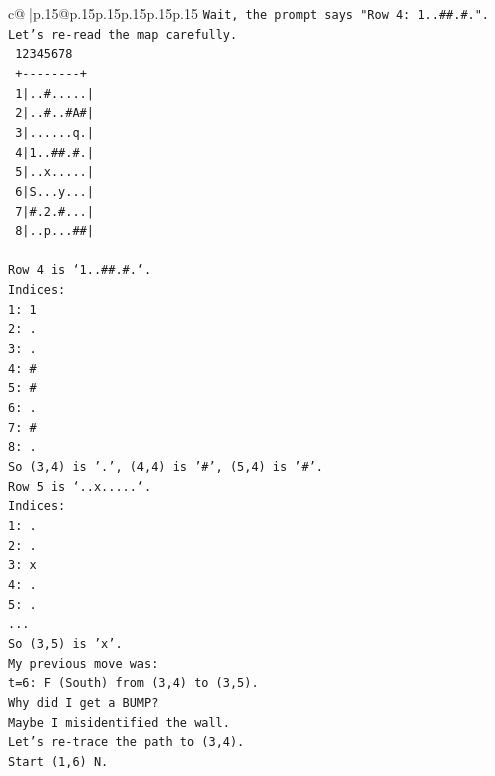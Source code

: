 \documentclass{article}
\begin{document}
{\begin{supertabular}{c@{$\;$}|p{.15\linewidth}@{}p{.15\linewidth}p{.15\linewidth}p{.15\linewidth}p{.15\linewidth}p{.15\linewidth}}
{{{\texttt{Wait, the prompt says "Row 4: 1..\#\#.\#.".} \\
\texttt{Let's re{-}read the map carefully.} \\
\texttt{   12345678} \\
\texttt{  +{-}{-}{-}{-}{-}{-}{-}{-}+} \\
\texttt{ 1|..\#.....|} \\
\texttt{ 2|..\#..\#A\#|} \\
\texttt{ 3|......q.|} \\
\texttt{ 4|1..\#\#.\#.|} \\
\texttt{ 5|..x.....|} \\
\texttt{ 6|S...y...|} \\
\texttt{ 7|\#.2.\#...|} \\
\texttt{ 8|..p...\#\#|} \\
\\ 
\texttt{Row 4 is `1..\#\#.\#.`.} \\
\texttt{Indices:} \\
\texttt{1: 1} \\
\texttt{2: .} \\
\texttt{3: .} \\
\texttt{4: \#} \\
\texttt{5: \#} \\
\texttt{6: .} \\
\texttt{7: \#} \\
\texttt{8: .} \\
\texttt{So (3,4) is '.', (4,4) is '\#', (5,4) is '\#'.} \\
\texttt{Row 5 is `..x.....`.} \\
\texttt{Indices:} \\
\texttt{1: .} \\
\texttt{2: .} \\
\texttt{3: x} \\
\texttt{4: .} \\
\texttt{5: .} \\
\texttt{...} \\
\texttt{So (3,5) is 'x'.} \\
\texttt{My previous move was:} \\
\texttt{t=6: F (South) from (3,4) to (3,5).} \\
\texttt{Why did I get a BUMP?} \\
\texttt{Maybe I misidentified the wall.} \\
\texttt{Let's re{-}trace the path to (3,4).} \\
\texttt{Start (1,6) N.} \\
}}}
\end{supertabular}}
\end{document}
